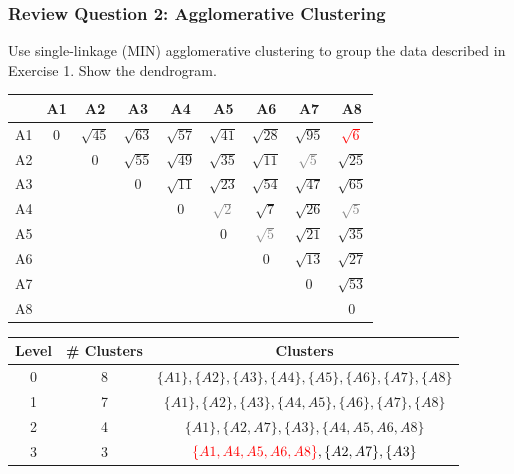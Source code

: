 \documentclass[aspectratio=169, 10pt]{beamer}
\begin{document}
\begin{frame}[t]
    \frametitle{Review Question 2: Agglomerative Clustering}
    \small
    Use single-linkage (MIN) agglomerative clustering to group the data described in Exercise 1. Show the dendrogram.
    \begin{table}[]
        \scriptsize
        \begin{tabular}{c|cccccccc}
           & A1 & A2 & A3 & A4 & A5 & A6 & A7 & A8 \\ \hline
        A1 & $0$  & $\sqrt{45}$ & $\sqrt{63}$ & $\sqrt{57}$ & $\sqrt{41}$ & $\sqrt{28}$ & $\sqrt{95}$ & \textcolor{red}{$\sqrt{6}$} \\
        A2 &    & $0$  & $\sqrt{55}$ & $\sqrt{49}$ & $\sqrt{35}$ & $\sqrt{11}$ & \textcolor{gray}{$\sqrt{5}$}  & $\sqrt{25}$ \\
        A3 &    &    & $0$  & $\sqrt{11}$ & $\sqrt{23}$ & $\sqrt{54}$ & $\sqrt{47}$ & $\sqrt{65}$ \\ 
        A4 &    &    &    & $0$  & \textcolor{gray}{$\sqrt{2}$} & $\sqrt{7}$  & $\sqrt{26}$ & \textcolor{gray}{$\sqrt{5}$}  \\
        A5 &    &    &    &    & $0$  & \textcolor{gray}{$\sqrt{5}$}  & $\sqrt{21}$ & $\sqrt{35}$ \\
        A6 &    &    &    &    &    & $0$  & $\sqrt{13}$ & $\sqrt{27}$ \\
        A7 &    &    &    &    &    &    & $0$  & $\sqrt{53}$ \\
        A8 &    &    &    &    &    &    &    & $0$ \\
        \end{tabular}
    \end{table}

    \begin{table}[]
        \scriptsize
        \begin{tabular}{c|c|c}
        Level & \# Clusters & Clusters \\ \hline
        0     & 8           & $\{A1\}, \{A2\}, \{A3\}, \{A4\}, \{A5\}, \{A6\}, \{A7\}, \{A8\}$\\
        1     & 7           & $\{A1\}, \{A2\}, \{A3\}, \{A4, A5\}, \{A6\}, \{A7\}, \{A8\}$\\
        2     & 4           & $\{A1\}, \{A2, A7\}, \{A3\}, \{A4, A5, A6,A8\}$\\
        3     & 3           & $\textcolor{red}{\{A1, A4, A5, A6,A8\}}, \{A2, A7\}, \{A3\}$\\
        \end{tabular}
    \end{table}

\end{frame}
\end{document}
